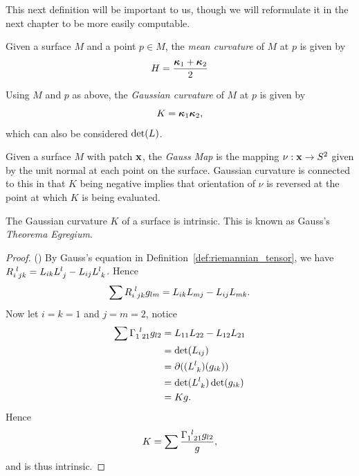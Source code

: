   This next definition will be important to us, though we will reformulate it in the next chapter to be more easily computable.
  \begin{defn}
    Given a surface $M$ and a point $p \in M$, the \emph{mean curvature} of $M$ at $p$ is given by
    \begin{equation}
      \label{eq:mean_curvature}
      H = \frac{\boldsymbol{\kappa}_1 + \boldsymbol{\kappa}_2}{2}
    \end{equation}
  \end{defn}


  \begin{defn}
    Using $M$ and $p$ as above, the \emph{Gaussian curvature} of $M$ at $p$ is given by
    \begin{equation}
      K = \boldsymbol{\kappa}_1\boldsymbol{\kappa}_2,
    \end{equation}
    which can also be considered $\det(L)$.
  \end{defn}

  \begin{defn}
    Given a surface $M$ with patch $\mathbf{x}$, the \emph{Gauss Map} is the mapping $\nu:\mathbf{x}\to S^2$ given by the unit normal at each point on the surface. Gaussian curvature is connected to this in that $K$ being negative implies that orientation of $\nu$ is reversed at the point at which $K$ is being evaluated.
  \end{defn}

  \begin{thm}
    The Gaussian curvature $K$ of a surface is intrinsic. This is known as Gauss's \emph{Theorema Egregium}.
  \end{thm}
  \begin{proof} (\cite{MP77})
    By Gauss's equation in Definition~\ref{def:riemannian_tensor}, we have $\Rmn = L_{ik}\llk{l}{j} - L_{ij}\Llk$. Hence
    \[
      \sum\Rmn g_{lm} = L_{ik}L_{mj} - L_{ij}L_{mk}.
    \]
    Now let $i = k = 1$ and $j = m = 2$, notice
    \begin{align*}
      \sum\rmn{1}{l}{2}{1}g_{l2} &= L_{11}L_{22} - L_{12}L_{21}\\
      &= \det(L_{ij})\\
      &= \del((\Llk) (g_{ik}))\\
      &= \det(\Llk)\det(g_{ik})\\
      &= K g.
    \end{align*}
    Hence
    \[
      K = \sum\frac{\rmn{1}{l}{2}{1}g_{l2}}{g},
    \]
    and is thus intrinsic.
  \end{proof}

